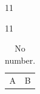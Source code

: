 \documentclass[paper=A4]{ropas-poster}
\begin{document}
\begin{postergrid}{1}{1}
\begin{posterblock}{1}{1}
\begin{table}[H]\begin{tabular}{cc}A&B\end{tabular}\caption*{No number.}\end{table}
\end{posterblock}
\end{postergrid}
\end{document}
